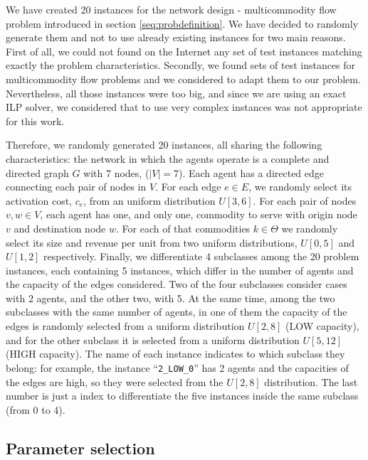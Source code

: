 \documentclass{article}
\begin{document}
We have created 20 instances for the network design - multicommodity flow problem introduced in section \ref{seq:probdefinition}. We have decided to randomly generate them and not to use already existing instances for two main reasons. First of all, we could not found on the Internet any set of test instances matching exactly the problem characteristics. Secondly, we found sets of test instances for multicommodity flow problems \parencite{MCFPWEB} and we considered to adapt them to our problem. Nevertheless, all those instances were too big, and since we are using an exact ILP solver, we considered that to use very complex instances was not appropriate for this work.

Therefore, we randomly generated 20 instances, all sharing the following characteristics: the network in which the agents operate is a complete and directed graph $G$ with 7 nodes, ($|V|=7$). Each agent has a directed edge connecting each pair of nodes in $V$. For each edge $e\in E$, we randomly select its activation cost, $c_e$, from an uniform distribution $U[3,6]$. For each pair of nodes $v,w\in V$, each agent has one, and only one, commodity to serve with origin node $v$ and destination node $w$. For each of that commodities $k\in \Theta$ we randomly select its size and revenue per unit from two uniform distributions, $U[0,5]$ and $U[1,2]$ respectively. Finally, we differentiate 4 subclasses among the 20 problem instances, each containing 5 instances, which differ in the number of agents and the capacity of the edges considered. Two of the four subclasses consider cases with 2 agents, and the other two, with 5. At the same time, among the two subclasses with the same number of agents,  in one of them the capacity of the edges is randomly selected from a uniform distribution $U[2,8]$ (LOW capacity), and for the other subclass it is selected from a uniform distribution $U[5,12]$ (HIGH capacity).
The name of each instance indicates to which subclass they belong: for example, the instance ``\texttt{2\_LOW\_0}'' has 2 agents and the capacities of the edges are high, so they were selected from the $U[2,8]$ distribution. The last number is just a index to differentiate the five instances inside the same subclass (from 0 to 4).

\subsection{Parameter selection}
\end{document}
